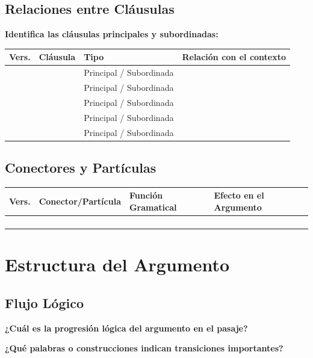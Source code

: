 \documentclass[11pt,a4paper]{article}
\begin{document}
\newpage

\subsection{Relaciones entre Cláusulas}

\textbf{Identifica las cláusulas principales y subordinadas:}

\begin{tabularx}{\textwidth}{|c|X|X|X|}
\hline
\textbf{Vers.} & \textbf{Cláusula} & \textbf{Tipo} & \textbf{Relación con el contexto} \\
\hline
& & Principal / Subordinada & \\[1cm]
\hline
& & Principal / Subordinada & \\[1cm]
\hline
& & Principal / Subordinada & \\[1cm]
\hline
& & Principal / Subordinada & \\[1cm]
\hline
& & Principal / Subordinada & \\[1cm]
\hline
\end{tabularx}

\subsection{Conectores y Partículas}

\begin{tabularx}{\textwidth}{|c|X|X|X|}
\hline
\textbf{Vers.} & \textbf{Conector/Partícula} & \textbf{Función Gramatical} & \textbf{Efecto en el Argumento} \\
\hline
& & & \\[1cm]
\hline
& & & \\[1cm]
\hline
& & & \\[1cm]
\hline
& & & \\[1cm]
\hline
\end{tabularx}

\section{Estructura del Argumento}

\subsection{Flujo Lógico}

\textbf{¿Cuál es la progresión lógica del argumento en el pasaje?}
\vspace{3cm}

\textbf{¿Qué palabras o construcciones indican transiciones importantes?}
\vspace{2cm}
\end{document}
